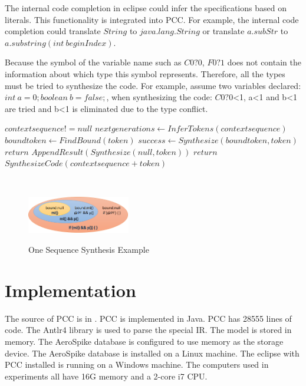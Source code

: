 \documentclass{sig-alternate-05-2015}
\begin{document}
The internal code completion in eclipse could infer the specifications based on literals. This functionality is integrated into PCC. For example, the internal code completion could translate $String$ to $java.lang.String$ or translate $a.subStr$ to $a.substring(int\ beginIndex)$.

 Because the symbol of the variable name such as $C0?0$, $F0?1$ does not contain the information about which type this symbol represents. Therefore, all the types must be tried to synthesize the code. For example, assume two variables declared: $int\ a = 0;boolean\ b = false;$, when synthesizing the code: $C0?0$<1, a<1 and b<1 are tried and b<1 is eliminated due to the type conflict.
\vspace{-0.5cm}
\\\begin {algorithm}
\caption {$SynthesizeCode(contextsequence)$}
\label{algorsyn}
\begin {algorithmic}
\REQUIRE $contextsequence != null$
\STATE $nextgenerations\leftarrow InferTokens(contextsequence)$
\STATE $boundtoken\leftarrow FindBound(token)$
\STATE $success\leftarrow Synthesize(boundtoken, token)$
\STATE $return$
\ENDIF
{}
\STATE $AppendResult(Synthesize(null, token))$
\STATE $return$
\ENDIF
\STATE $SynthesizeCode(contextsequence + token)$
\ENDFOR
\end {algorithmic}
\end {algorithm}
\vspace{-0.25cm}
\\\begin{figure}
  \centering
  \includegraphics[width=0.4\textwidth]{pics/synthesizeexample.png}\\
  \caption{One Sequence Synthesis Example}\label{synthesizerexample}
\end{figure}
\vspace{-0.4cm}

\section{Implementation}

The source of PCC is in \cite{pccsource}. PCC is implemented in Java. PCC has 28555 lines of code. The Antlr4 \cite{antlr4} library is used to parse the special IR. The model is stored in memory. The AeroSpike database is configured to use memory as the storage device. The AeroSpike database is installed on a Linux machine. The eclipse with PCC installed is running on a Windows machine. The computers used in experiments all have 16G memory and a 2-core i7 CPU.
\end{document}
